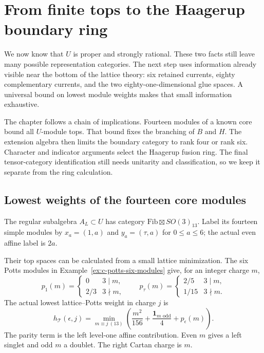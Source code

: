 \chapter{From finite tops to the Haagerup boundary ring}
\label{ch:branching}

We now know that $U$ is proper and strongly rational. These two facts
still leave many possible representation categories. The next step
uses information already visible near the bottom of the lattice
theory: six retained currents, eighty complementary currents, and
the two eighty-one-dimensional glue spaces. A universal bound on
lowest module weights makes that small information exhaustive.

The chapter follows a chain of implications. Fourteen modules of a
known core bound all $U$-module tops. That bound fixes the branching
of $B$ and $H$. The extension algebra then limits the boundary category
to rank four or rank six. Character and indicator arguments select the
Haagerup fusion ring. The final tensor-category identification still
needs unitarity and classification, so we keep it separate from the
ring calculation.

\section{Lowest weights of the fourteen core modules}

The regular subalgebra $A_L\subset U$ has category
$\mathrm{Fib}\boxtimes SO(3)_{13}$. Label its fourteen simple modules
by $x_a=(1,a)$ and $y_a=(\tau,a)$ for $0\leq a\leq6$; the actual
even affine label is $2a$.

Their top spaces can be calculated from a small lattice minimization.
The six Potts modules in Example~\ref{ex:c-potts-six-modules} give,
for an integer charge $m$,
\[
 p_1(m)=\begin{cases}0&3\mid m,\\2/3&3\nmid m,\end{cases}
 \qquad
 p_\tau(m)=\begin{cases}2/5&3\mid m,\\1/15&3\nmid m.\end{cases}
\]
The actual lowest lattice--Potts weight in charge $j$ is
\begin{equation}\label{eq:c-T-top}
 h_{\mathcal T}(\epsilon,j)=
 \min_{m\equiv j\ (13)}
 \left(\frac{m^2}{156}+\frac{\mathbf1_{m\text{ odd}}}{4}
                                      +p_\epsilon(m)\right).
\end{equation}
The parity term is the left level-one affine contribution. Even $m$
gives a left singlet and odd $m$ a doublet. The right Cartan charge
is $m$.

